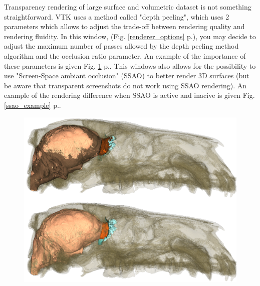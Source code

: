 Transparency rendering of large surface and volumetric dataset is not something straightforward. VTK uses a method called "depth peeling", which uses 2 parameters which allows to adjust the trade-off between rendering quality and rendering fluidity. 
In this window, (Fig. \ref{renderer_options} p.\pageref{renderer_options}), you may decide to adjust the maximum number of passes allowed by the depth peeling method algorithm and the occlusion ratio parameter. An example of the importance of these parameters is given Fig. \ref{occlusion_example} p.\pageref{occlusion_example}. This windows also allows for the possibility to use  "Screen-Space ambiant occlusion" (SSAO) to better render 3D surfaces (but be aware that transparent screenshots do not work using SSAO rendering). An example of the rendering difference when SSAO is active and inacive is given Fig. \ref{ssao_example} p.\pageref{ssao_example}.

\begin{figure}
  \centering  
 \includegraphics[scale=0.35]{images/08/occlusion_ratio.png}
\label{occlusion_example}
\end{figure}


